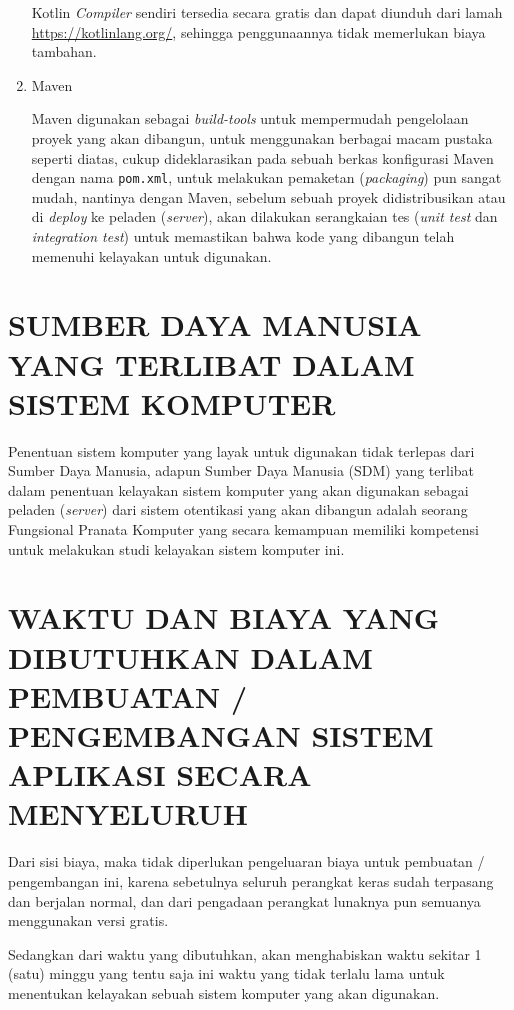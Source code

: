 \documentclass[pdftex,12pt, oneside]{article}
\begin{document}
\begin{enumerate}
Kotlin \textit{Compiler} sendiri tersedia secara gratis dan dapat diunduh dari lamah \href{https://kotlinlang.org/}{https://kotlinlang.org/}, sehingga penggunaannya tidak memerlukan biaya tambahan.

	\item Maven

Maven digunakan sebagai \textit{build-tools} untuk mempermudah pengelolaan proyek yang akan dibangun, untuk menggunakan berbagai macam pustaka seperti diatas, cukup dideklarasikan pada sebuah berkas konfigurasi Maven dengan nama \texttt{pom.xml}, untuk melakukan pemaketan (\textit{packaging}) pun sangat mudah, nantinya dengan Maven, sebelum sebuah proyek didistribusikan atau di \textit{deploy} ke peladen (\textit{server}), akan dilakukan serangkaian tes (\textit{unit test} dan \textit{integration test}) untuk memastikan bahwa kode yang dibangun telah memenuhi kelayakan untuk digunakan.

\end{enumerate}

\section{SUMBER DAYA MANUSIA YANG TERLIBAT DALAM SISTEM KOMPUTER}

Penentuan sistem komputer yang layak untuk digunakan tidak terlepas dari Sumber Daya Manusia, adapun Sumber Daya Manusia (SDM) yang terlibat dalam penentuan kelayakan sistem komputer yang akan digunakan sebagai peladen (\textit{server}) dari sistem otentikasi yang akan dibangun adalah seorang Fungsional Pranata Komputer yang secara kemampuan memiliki kompetensi untuk melakukan studi kelayakan sistem komputer ini.

\section{WAKTU DAN BIAYA YANG DIBUTUHKAN DALAM PEMBUATAN / PENGEMBANGAN SISTEM APLIKASI SECARA MENYELURUH}

Dari sisi biaya, maka tidak diperlukan pengeluaran biaya untuk pembuatan / pengembangan ini, karena sebetulnya seluruh perangkat keras sudah terpasang dan berjalan normal, dan dari pengadaan perangkat lunaknya pun semuanya menggunakan versi gratis.

Sedangkan dari waktu yang dibutuhkan, akan menghabiskan waktu sekitar 1 (satu) minggu yang tentu saja ini waktu yang tidak terlalu lama untuk menentukan kelayakan sebuah sistem komputer yang akan digunakan.
\end{document}
